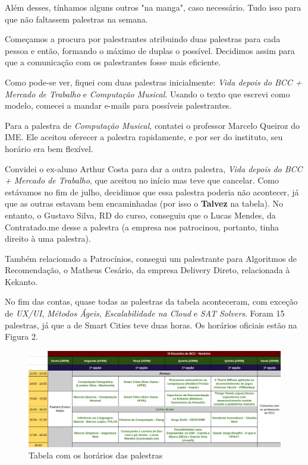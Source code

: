 \documentclass[12pt,letterpaper]{article}
\begin{document}
	Além desses, tínhamos alguns outros "na manga", caso necessário. Tudo isso para que não faltassem palestras na semana.
	
	Começamos a procura por palestrantes atribuindo duas palestras para cada pessoa e então, formando o máximo de duplas o possível. Decidimos assim para que a comunicação com os palestrantes fosse mais eficiente. 
	
	Como pode-se ver, fiquei com duas palestras inicialmente: \textit{Vida depois do BCC + Mercado de Trabalho} e \textit{Computação Musical}. Usando o texto que escrevi como modelo\cite{modelo_palestras}, comecei a mandar e-mails para possíveis palestrantes. 
	
	Para a palestra de \textit{Computação Musical}, contatei o professor Marcelo Queiroz do IME. Ele aceitou oferecer a palestra rapidamente, e por ser do instituto, seu horário era bem flexível.
	
	Convidei o ex-aluno Arthur Costa para dar a outra palestra, \textit{Vida depois do BCC + Mercado de Trabalho}, que aceitou no início mas teve que cancelar. Como estávamos no fim de julho, decidimos que essa palestra poderia não acontecer, já que as outras estavam bem encaminhadas (por isso o \textbf{{\color{orange} Talvez}} na tabela). No entanto, o Gustavo Silva, RD do curso, conseguiu que o Lucas Mendes, da Contratado.me desse a palestra (a empresa nos patrocinou, portanto, tinha direito à uma palestra).
	
	Também relacionado a Patrocínios, consegui um palestrante para Algoritmos de Recomendação, o Matheus Cesário, da empresa Delivery Direto, relacionada à Kekanto.
	
	No fim das contas, quase todas as palestras da tabela aconteceram, com exceção de \textit{UX/UI}, \textit{Métodos Ágeis}, \textit{Escalabilidade na Cloud} e \textit{SAT Solvers}. Foram 15 palestras, já que a de Smart Cities teve duas horas. Os horários oficiais estão na Figura 2.
	
	\begin{figure}
		\begin{center}
			\includegraphics[scale=0.43]{horarios.png} 
			\caption{Tabela com os horários das palestras}
		\end{center}
	\end{figure}
\end{document}
